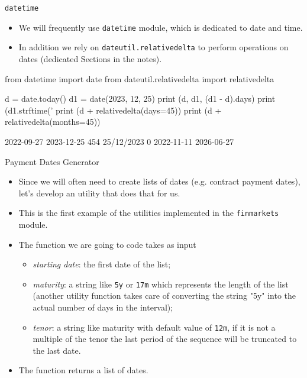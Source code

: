 \documentclass{beamer}
\begin{document}
\begin{frame}[fragile]{\texttt{datetime}}
  \begin{itemize}
  \item We will frequently use \texttt{datetime} module, which is dedicated to date and time.
  \item In addition we rely on \texttt{dateutil.relativedelta} to perform operations on dates (dedicated Sections in the notes).
  \end{itemize}
  \begin{ipython}
from datetime import date
from dateutil.relativedelta import relativedelta
		
d = date.today()
d1 = date(2023, 12, 25)
print (d, d1, (d1 - d).days)
print (d1.strftime('%
print (d + relativedelta(days=45))
print (d + relativedelta(months=45))
\end{ipython}
\begin{ioutput}
2022-09-27 2023-12-25 454
25/12/2023 0
2022-11-11
2026-06-27
\end{ioutput}
\end{frame}

\begin{frame}{Payment Dates Generator}
  \begin{itemize}
  \item Since we will often need to create lists of dates (e.g. contract payment dates), let's develop an utility that does that for us.
  \item This is the first example of the utilities implemented in the \texttt{finmarkets} module.
  \item The function we are going to code takes as input
    \begin{itemize}
    \item \emph{starting date}: the first date of the list;
    \item \emph{maturity}: a string like \texttt{5y} or \texttt{17m} which represents the length of the list (another utility function takes care of converting the string "5y" into the actual number of days in the interval);
    \item \emph{tenor}: a string like maturity with default value of \texttt{12m}, if it is not a multiple of the tenor the last period of the sequence will be truncated to the last date.
    \end{itemize}
  \item The function returns a list of dates.
  \end{itemize}		
\end{frame}
\end{document}

